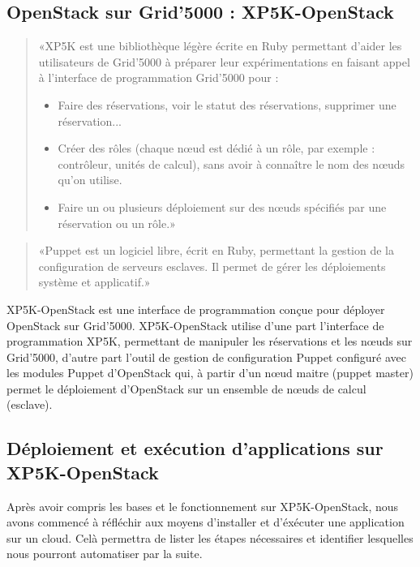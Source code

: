 \documentclass{report}
\begin{document}
		  \subsection{OpenStack sur Grid'5000 : XP5K-OpenStack}
		  
		     \begin{quote}  %
                «XP5K est une bibliothèque légère écrite en Ruby permettant d'aider les utilisateurs de Grid'5000 à préparer leur expérimentations en faisant appel à l'interface de programmation Grid'5000 pour :
                \begin{itemize}
                \item Faire des réservations, voir le statut des réservations, supprimer une réservation...
                \item Créer des rôles (chaque nœud est dédié à un rôle, par exemple : contrôleur, unités de calcul), sans avoir à connaître le nom des nœuds qu'on utilise.
                \item Faire un ou plusieurs déploiement sur des nœuds spécifiés par une réservation ou un rôle.» \cite{XP5K}
                \end{itemize}
            \end{quote}
            
            \begin{quote}
		       «Puppet est un logiciel libre, écrit en Ruby, permettant la gestion de la configuration de serveurs esclaves. Il permet de gérer les déploiements système et applicatif.»
		       \cite{Puppet}
		    \end{quote}
		   
            XP5K-OpenStack est une interface de programmation conçue pour déployer OpenStack sur Grid'5000.
            XP5K-OpenStack utilise d'une part l'interface de programmation XP5K, permettant de manipuler les réservations et les nœuds sur Grid'5000, d'autre part l'outil de gestion de configuration Puppet configuré avec les modules Puppet d'OpenStack qui, à partir d'un nœud maitre (puppet master) permet le déploiement d'OpenStack sur un ensemble de nœuds de calcul (esclave).
            
		  \subsection{Déploiement et exécution d'applications sur XP5K-OpenStack}
Après avoir compris les bases et le fonctionnement sur XP5K-OpenStack, nous avons commencé à réfléchir aux moyens d'installer et d'éxécuter une application sur un cloud. Celà permettra de lister les étapes nécessaires et identifier lesquelles nous pourront automatiser par la suite.\bigbreak
\end{document}
